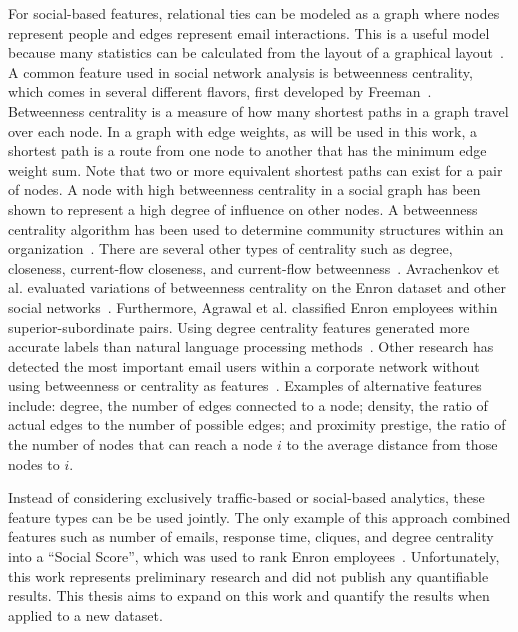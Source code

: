 \documentclass[12pt]{report}
\begin{document}
For social-based features, relational ties can be modeled as a graph where nodes represent people and edges represent email interactions.
This is a useful model because many statistics can be calculated from the layout of a graphical layout~\cite{wasserman_social_1994}.
A common feature used in social network analysis is betweenness centrality, which comes in several different flavors, first developed by Freeman~\cite{freeman_set_1977}.
Betweenness centrality is a measure of how many shortest paths in a graph travel over each node.
In a graph with edge weights, as will be used in this work, a shortest path is a route from one node to another that has the minimum edge weight sum.
Note that two or more equivalent shortest paths can exist for a pair of nodes.
A node with high betweenness centrality in a social graph has been shown to represent a high degree of influence on other nodes.
A betweenness centrality algorithm has been used to determine community structures within an organization~\cite{tyler_email_2003}.
There are several other types of centrality such as degree, closeness, current-flow closeness, and current-flow betweenness~\cite{balinsky2011rapid}.
Avrachenkov et al. evaluated variations of betweenness centrality on the Enron dataset and other social networks~\cite{avrachenkov2013alpha}.
Furthermore, Agrawal et al. classified Enron employees within superior-subordinate pairs.
Using degree centrality features generated more accurate labels than natural language processing methods~\cite{agarwal_comprehensive_2012}.
Other research has detected the most important email users within a corporate network without using betweenness or centrality as features~\cite{wilson_discovery_2009}.
Examples of alternative features include: degree, the number of edges connected to a node; density, the ratio of actual edges to the number of possible edges; and proximity prestige, the ratio of the number of nodes that can reach a node $i$ to the average distance from those nodes to $i$.

Instead of considering exclusively traffic-based or social-based analytics, these feature types can be be used jointly.
The only example of this approach combined features such as number of emails, response time, cliques, and degree centrality into a ``Social Score'', which was used to rank Enron employees~\cite{rowe_automated_2007}.  
Unfortunately, this work represents preliminary research and did not publish any quantifiable results.
This thesis aims to expand on this work and quantify the results when applied to a new dataset.
\end{document}
